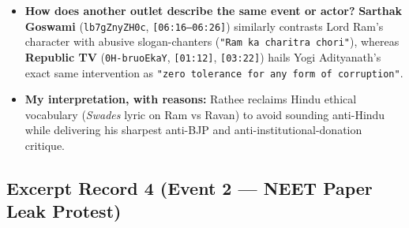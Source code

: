 \documentclass[10pt,a4paper]{article}
\begin{document}
\begin{itemize}[leftmargin=1.5em, itemsep=3pt, topsep=4pt]
  \item \textbf{How does another outlet describe the same event or actor?} \textbf{Sarthak Goswami} (\texttt{lb7gZnyZH0c}, \texttt{[06:16--06:26]}) similarly contrasts Lord Ram's character with abusive slogan-chanters (\texttt{"Ram ka charitra chori"}), whereas \textbf{Republic TV} (\texttt{0H-bruoEkaY}, \texttt{[01:12]}, \texttt{[03:22]}) hails Yogi Adityanath's exact same intervention as \texttt{"zero tolerance for any form of corruption"}.
  \item \textbf{My interpretation, with reasons:} Rathee reclaims Hindu ethical vocabulary (\textit{Swades} lyric on Ram vs Ravan) to avoid sounding anti-Hindu while delivering his sharpest anti-BJP and anti-institutional-donation critique.
\end{itemize}

\subsection*{Excerpt Record 4 (Event 2 --- NEET Paper Leak Protest)}
\end{document}
